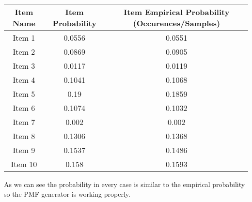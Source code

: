 \documentclass{article}
\begin{document}
\begin{tabular}{| c | c | c |}

\hline
{\bf Item Name} & {\bf Item Probability} & {\bf Item Empirical Probability (Occurences/Samples)} \\
\hline
Item 1 & 0.0556 & 0.0551 \\
\hline
Item 2 & 0.0869 & 0.0905 \\
\hline
Item 3 & 0.0117 & 0.0119 \\
\hline
Item 4 & 0.1041 & 0.1068 \\
\hline
Item 5 & 0.19 & 0.1859 \\
\hline
Item 6 & 0.1074 & 0.1032 \\
\hline
Item 7 & 0.002 & 0.002 \\
\hline
Item 8 & 0.1306 & 0.1368 \\
\hline
Item 9 & 0.1537 & 0.1486 \\
\hline
Item 10 & 0.158 & 0.1593 \\
\hline
\end{tabular}

\vspace{10mm}

As we can see the probability in every case is similar to the empirical probability so the PMF generator is working properly.
\end{document}
